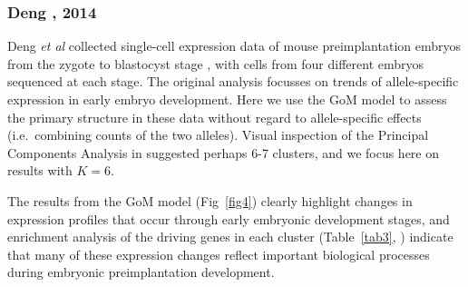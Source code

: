 \documentclass[10pt,letterpaper]{article}
\begin{document}
\subsubsection*{Deng , 2014}

Deng \textit{et al} collected single-cell expression data of mouse preimplantation embryos from the zygote to blastocyst stage \cite{Deng2014}, with cells from four different embryos sequenced at each stage. The original analysis \cite{Deng2014} focusses on trends of allele-specific expression in early embryo development. Here we use the GoM model to assess the primary structure in these data without regard to allele-specific effects (i.e.~combining counts of the two alleles). Visual inspection of the Principal Components Analysis in \cite{Deng2014} suggested perhaps 6-7 clusters, and we focus here on results with $K=6$.

The results from the GoM model (Fig~\ref{fig4}) clearly highlight changes in expression profiles that occur through early embryonic development stages, and enrichment analysis of the driving genes in each cluster (Table~\ref{tab3},  ) indicate that many of these expression changes reflect important biological processes during embryonic preimplantation development.

%
\end{document}
